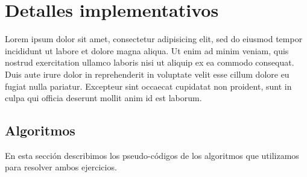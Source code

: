 \section{Detalles implementativos}
Lorem ipsum dolor sit amet, consectetur adipisicing elit, sed do eiusmod
tempor incididunt ut labore et dolore magna aliqua. Ut enim ad minim veniam,
quis nostrud exercitation ullamco laboris nisi ut aliquip ex ea commodo
consequat. Duis aute irure dolor in reprehenderit in voluptate velit esse
cillum dolore eu fugiat nulla pariatur. Excepteur sint occaecat cupidatat non
proident, sunt in culpa qui officia deserunt mollit anim id est laborum.

\subsection{Algoritmos}
En esta sección describimos los pseudo-códigos de los algoritmos que utilizamos para resolver ambos ejercicios.

\begin{center}
\noindent{}
\end{center}



\begin{center}
\noindent{}
\end{center}


